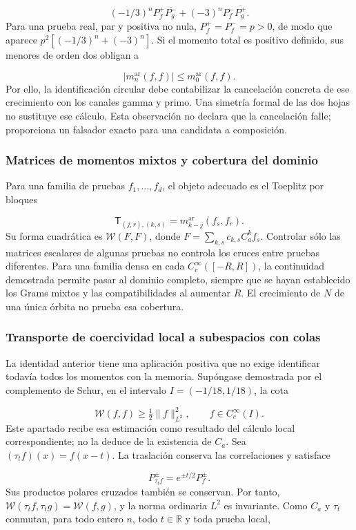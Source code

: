 \[
(-1/3)^nP_f^+\overline{P_g^-}
+(-3)^nP_f^-\overline{P_g^+}.
\]
Para una prueba real, par y positiva no nula, \(P_f^+=P_f^-=p>0\), de modo que aparece \(p^2[(-1/3)^n+(-3)^n]\). Si el momento total es positivo definido, sus menores de orden dos obligan a

\[
|m_n^{\mathrm{ar}}(f,f)|\le m_0^{\mathrm{ar}}(f,f).
\]
Por ello, la identificación circular debe contabilizar la cancelación concreta de ese crecimiento con los canales gamma y primo. Una simetría formal de las dos hojas no sustituye ese cálculo. Esta observación no declara que la cancelación falle; proporciona un falsador exacto para una candidata a composición.


\subsubsection{Matrices de momentos mixtos y cobertura del dominio}
\label{viii:tm-add-m6-2}
Para una familia de pruebas \(f_1,\ldots,f_d\), el objeto adecuado es el Toeplitz por bloques

\[
\mathsf T_{(j,r),(k,s)}
=m_{k-j}^{\mathrm{ar}}(f_s,f_r).
\]
Su forma cuadrática es \(\mathscr W(F,F)\), donde \(F=\sum_{k,s}c_{k,s}C_a^k f_s\). Controlar sólo las matrices escalares de algunas pruebas no controla los cruces entre pruebas diferentes. Para una familia densa en cada \(C_c^\infty([-R,R])\), la continuidad demostrada permite pasar al dominio completo, siempre que se hayan establecido los Grams mixtos y las compatibilidades al aumentar \(R\). El crecimiento de \(N\) de una única órbita no prueba esa cobertura.


\subsubsection{Transporte de coercividad local a subespacios con colas}
\label{viii:tm-add-m6-3}
\label{viii:tm-add:familias-transportadas}
La identidad anterior tiene una aplicación positiva que no exige identificar todavía todos los momentos con la memoria. Supóngase demostrada por el complemento de Schur, en el intervalo \(I=(-1/18,1/18)\), la cota

\[
\mathscr W(f,f)\geq\tfrac12\|f\|_{L^2}^2,
\qquad f\in C_c^\infty(I).
\]
Este apartado recibe esa estimación como resultado del cálculo local correspondiente; no la deduce de la existencia de \(C_a\). Sea \((\tau_t f)(x)=f(x-t)\). La traslación conserva las correlaciones y satisface

\[
P_{\tau_t f}^{\pm}=e^{\pm t/2}P_f^{\pm}.
\]
Sus productos polares cruzados también se conservan. Por tanto, \(\mathscr W(\tau_t f,\tau_t g)=\mathscr W(f,g)\), y la norma ordinaria \(L^2\) es invariante. Como \(C_a\) y \(\tau_t\) conmutan, para todo entero \(n\), todo \(t\in\mathbb R\) y toda prueba local,


